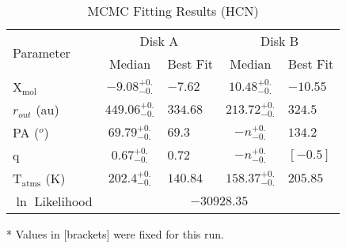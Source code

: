 \begin{table}[h!]
  \centering
  \begin{threeparttable}
    \caption{MCMC Fitting Results (HCN)}
    \label{table:fit_hcn}
    \renewcommand{\arraystretch}{1.2}
    \begin{tabular}{l c l c l }
      \toprule \toprule
      \multirow{2}{*}{Parameter} & \multicolumn{2}{c}{Disk A} & \multicolumn{2}{c}{Disk B} \\
                                 & Median & Best Fit          & Median & Best Fit \\
      \midrule %
      X$_\text{mol}$       & $ -9.08_{-0.} ^{+0.}$ & $-7.62$    & $ 10.48_{-0.} ^{+0.}$ & $-10.55$ \\
      $r_{out}$ (au)       & $ 449.06_{-0.} ^{+0.}$ & $334.68$    & $ 213.72_{-0.}^{+0.}$  & $324.5$    \\
      PA  ($^o$)           & $ 69.79_{-0.} ^{+0.}$  & $69.3$   & $ -n _{-0.} ^{+0.}$  & $134.2$  \\
      q                    & $ 0.67_{-0.} ^{+0.}$   & $0.72$   & $ -n _{-0.} ^{+0.}$  & $[-0.5]$  \\
      T$_\text{atms}$ (K)  & $ 202.4_{-0.} ^{+0.}$  & $140.84$  & $ 158.37_{-0.} ^{+0.}$  & $205.85$  \\
      $\ln$ Likelihood     & \multicolumn{4}{c}{$-30928.35$} \\
      \bottomrule
    \end{tabular}
    \begin{tablenotes}\footnotesize
      \item[*] Values in [brackets] were fixed for this run.
    \end{tablenotes}
  \end{threeparttable}
\end{table}






